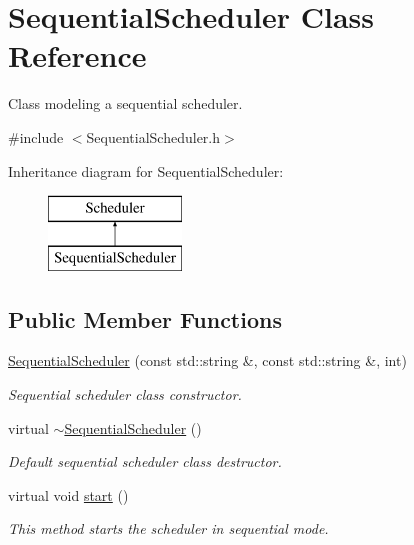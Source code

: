 \hypertarget{classSequentialScheduler}{\section{Sequential\-Scheduler Class Reference}
\label{classSequentialScheduler}
}


Class modeling a sequential scheduler.  




{\ttfamily \#include $<$Sequential\-Scheduler.\-h$>$}

Inheritance diagram for Sequential\-Scheduler\-:\begin{figure}[H]
\begin{center}
\leavevmode
\includegraphics[height=2.000000cm]{classSequentialScheduler}
\end{center}
\end{figure}
\subsection*{Public Member Functions}
\begin{DoxyCompactItemize}
\item 
\hyperlink{classSequentialScheduler_a4c04f1691f53c150a1fe2a2be5a92bed}{Sequential\-Scheduler} (const std\-::string \&, const std\-::string \&, int)
\begin{DoxyCompactList}\small\item\em Sequential scheduler class constructor. \end{DoxyCompactList}\item 
virtual \hyperlink{classSequentialScheduler_a4603b4f03aba99b87a80d75f68dbd746}{$\sim$\-Sequential\-Scheduler} ()
\begin{DoxyCompactList}\small\item\em Default sequential scheduler class destructor. \end{DoxyCompactList}\item 
virtual void \hyperlink{classSequentialScheduler_a9603767b779a4612f02ac85bc4c49bf6}{start} ()
\begin{DoxyCompactList}\small\item\em This method starts the scheduler in sequential mode. \end{DoxyCompactList}\end{DoxyCompactItemize}
